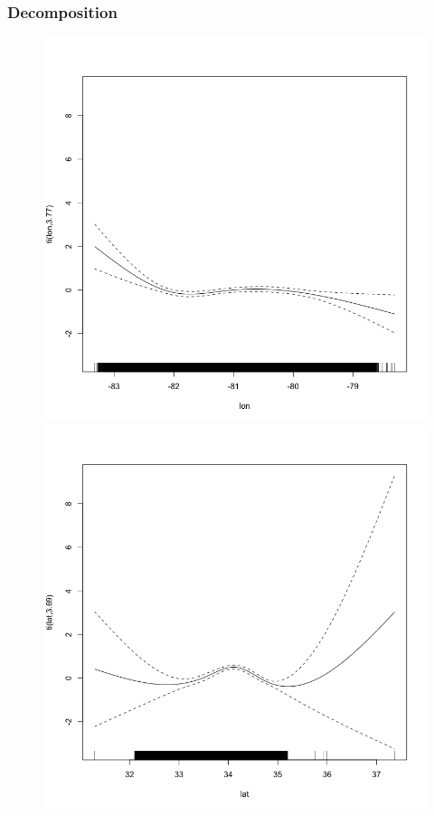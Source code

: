 \documentclass{beamer}
\begin{document}
\begin{frame}
\frametitle{Decomposition}

\begin{multicols}{2}

\begin{figure}
\includegraphics[scale=.1]{figures/lon}

\includegraphics[scale=.1]{figures/lat}
\end{figure}


\end{multicols}
\end{frame}
\end{document}
